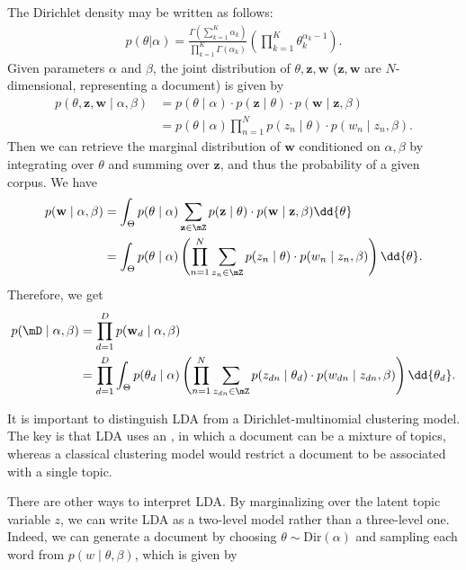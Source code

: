 The Dirichlet density may be written as follows:
\begin{align*}
    p(\theta|\alpha) = \frac{\Gamma\left( \sum\limits_{k=1}^{K} \alpha_k \right)}{\prod\limits_{k=1}^{K} \Gamma(\alpha_k)} \left( \prod\limits_{k=1}^{K} \theta_k^{\alpha_k-1} \right).
\end{align*}
Given parameters $\alpha$ and $\beta$, the joint distribution of $\theta, \mathbf{z}, \mathbf{w}$ ($\mathbf{z}, \mathbf{w}$ are $N$-dimensional, representing a document) is given by
\begin{align*}
    p(\theta, \mathbf{z}, \mathbf{w}\mid \alpha, \beta) 
    &= p(\theta\mid \alpha) \cdot p(\mathbf{z} \mid \theta) \cdot p(\mathbf{w} \mid \mathbf{z}, \beta)\\
    &= p(\theta\mid\alpha) \prod\limits_{n=1}^{N} p(z_n\mid \theta)\cdot p(w_n\mid z_n, \beta).
\end{align*}
Then we can retrieve the marginal distribution of $\mathbf{w}$ conditioned on $\alpha, \beta$ by integrating over $\theta$ and summing over $\mathbf{z}$, and thus the probability of a given corpus. We have
\begin{align*}
    p(\mathbf{w}\mid \alpha, \beta)
    &= \int_{\Theta} p(\theta \mid \alpha) \sum\limits_{\mathbf{z}\in \mZ}^{} p(\mathbf{z}\mid\theta) \cdot p(\mathbf{w}\mid \mathbf{z}, \beta) \dd{\theta}\\
    &= \int_{\Theta} p(\theta \mid \alpha) \left( \prod\limits_{n=1}^{N} \sum\limits_{z_n \in \mZ}^{} p(z_n\mid\theta)\cdot p(w_n\mid z_n, \beta) \right) \dd{\theta}.
\end{align*}
{Therefore, we get}
\begin{align*}
    p(\mD \mid \alpha, \beta)
    &= \prod\limits_{d=1}^{D} p(\mathbf{w}_d \mid \alpha, \beta)\\
    &= \prod\limits_{d=1}^{D}\int_{\Theta} p(\theta_d \mid \alpha) \left( \prod\limits_{n=1}^{N} \sum\limits_{z_{dn} \in \mZ}^{} p(z_{dn}\mid\theta_d)\cdot p(w_{dn}\mid z_{dn}, \beta) \right) \dd{\theta_d}.
\end{align*}
\begin{remark}
    It is important to distinguish LDA from a Dirichlet-multinomial clustering model. The key is that LDA uses an , in which a document can be a mixture of topics, whereas a classical clustering model would restrict a document to be associated with a single topic.
\end{remark}
There are other ways to interpret LDA. By marginalizing over the latent topic variable $z$, we can write LDA as a two-level model rather than a three-level one. Indeed, we can generate a document by choosing $\theta \sim \text{Dir}(\alpha)$ and sampling each word from $p(w\mid \theta, \beta)$, which is given by
